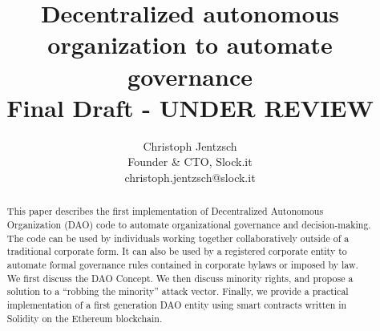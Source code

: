 \documentclass[9pt,oneside]{amsart}
\title{Decentralized autonomous organization to automate governance\\ {\smaller \textbf{Final Draft - UNDER REVIEW}}}
\author{
    Christoph Jentzsch\\
    Founder \& CTO, Slock.it\\
    christoph.jentzsch@slock.it
}
\begin{document}
\begin{abstract}
This paper describes the first implementation of Decentralized Autonomous Organization (DAO) code to automate organizational governance and decision-making. The code can be used by individuals working together collaboratively outside of a traditional corporate form. It can also be used by a registered corporate entity to automate formal governance rules contained in corporate bylaws or imposed by law.  We first discuss the DAO Concept.  We then discuss minority rights, and propose a solution to a ``robbing the minority'' attack vector.  Finally, we provide a practical implementation of a first generation DAO entity using smart contracts written in Solidity on the Ethereum blockchain.
\end{abstract}

\maketitle
\end{document}
